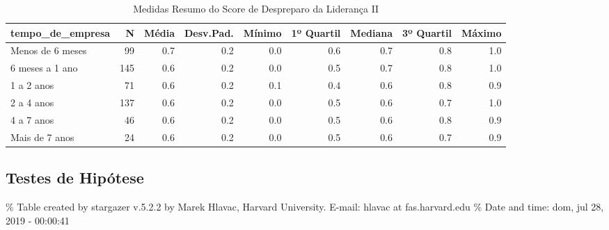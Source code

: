 \documentclass[]{book}
\begin{document}
\begin{table}[t]

\caption{\label{tab:unnamed-chunk-17}Medidas Resumo do Score de Despreparo da Liderança II}
\centering
\fontsize{7}{9}\selectfont
\begin{tabular}{lrrrrrrrr}
\toprule
tempo\_de\_empresa & N & Média & Desv.Pad. & Mínimo & 1º Quartil & Mediana & 3º Quartil & Máximo\\
\midrule
Menos de 6 meses & 99 & 0.7 & 0.2 & 0.0 & 0.6 & 0.7 & 0.8 & 1.0\\
6 meses a 1 ano & 145 & 0.6 & 0.2 & 0.0 & 0.5 & 0.7 & 0.8 & 1.0\\
1 a 2 anos & 71 & 0.6 & 0.2 & 0.1 & 0.4 & 0.6 & 0.8 & 0.9\\
2 a 4 anos & 137 & 0.6 & 0.2 & 0.0 & 0.5 & 0.6 & 0.7 & 1.0\\
4 a 7 anos & 46 & 0.6 & 0.2 & 0.0 & 0.5 & 0.6 & 0.8 & 0.9\\
\addlinespace
Mais de 7 anos & 24 & 0.6 & 0.2 & 0.0 & 0.5 & 0.6 & 0.7 & 0.9\\
\bottomrule
\end{tabular}
\end{table}

\pagebreak

\hypertarget{testes-de-hipotese-3}{%
\subsection{Testes de Hipótese}\label{testes-de-hipotese-3}}

\% Table created by stargazer v.5.2.2 by Marek Hlavac, Harvard University. E-mail: hlavac at fas.harvard.edu
\% Date and time: dom, jul 28, 2019 - 00:00:41
\end{document}
